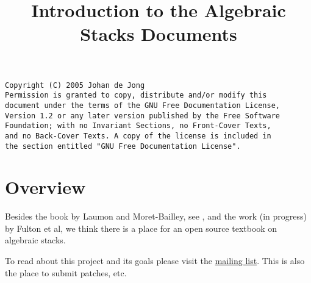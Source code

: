 

%


\title{Introduction to the Algebraic Stacks Documents}


\maketitle

\begin{verbatim}
Copyright (C) 2005 Johan de Jong
Permission is granted to copy, distribute and/or modify this
document under the terms of the GNU Free Documentation License,
Version 1.2 or any later version published by the Free Software
Foundation; with no Invariant Sections, no Front-Cover Texts,
and no Back-Cover Texts. A copy of the license is included in
the section entitled "GNU Free Documentation License".
\end{verbatim}

\tableofcontents

\section{Overview}
\label{section-overview}

\noindent
Besides the book by Laumon and Moret-Bailley, see \cite{LM-B}, and the work
(in progress) by Fulton et al, we think there is a place for an open source
textbook on algebraic stacks.

\smallskip\noindent
To read about this project and its goals please visit the
\href{http://www.math.columbia.edu/mailman/listinfo/algebraic_geometry}%
{mailing list}. This is also the place to submit patches, etc.







